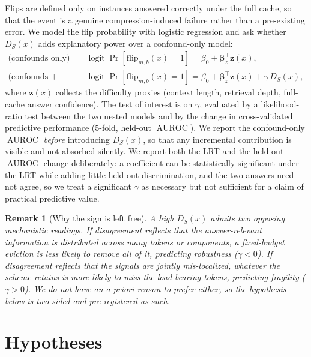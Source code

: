 \documentclass[11pt]{article}
\newtheorem{remark}{Remark}
\DeclareMathOperator{\AUROC}{AUROC}
\begin{document}
Flips are defined only on instances answered correctly under the full cache,
so that the event is a genuine compression-induced failure rather than a
pre-existing error. We model the flip probability with logistic regression
and ask whether $D_S(x)$ adds explanatory power over a confound-only model:
\begin{align}
  \text{(confounds only)} \quad
  &\operatorname{logit} \Pr[\mathrm{flip}_{m,b}(x)=1]
   = \beta_0 + \boldsymbol{\beta}_z^\top \mathbf{z}(x), \\[4pt]
  \text{(confounds + disagreement)} \quad
  &\operatorname{logit} \Pr[\mathrm{flip}_{m,b}(x)=1]
   = \beta_0 + \boldsymbol{\beta}_z^\top \mathbf{z}(x) + \gamma\,D_S(x),
\end{align}
where $\mathbf{z}(x)$ collects the difficulty proxies (context length,
retrieval depth, full-cache answer confidence). The test of interest is on
$\gamma$, evaluated by a likelihood-ratio test between the two nested models
and by the change in cross-validated predictive performance ($5$-fold,
held-out $\AUROC$). We report the confound-only $\AUROC$ \emph{before}
introducing $D_S(x)$, so that any incremental contribution is visible and
not absorbed silently. We report both the LRT and the held-out $\AUROC$
change deliberately: a coefficient can be statistically significant under the
LRT while adding little held-out discrimination, and the two answers need not
agree, so we treat a significant $\gamma$ as necessary but not sufficient for
a claim of practical predictive value.

\begin{remark}[Why the sign is left free]
A high $D_S(x)$ admits two opposing mechanistic readings. If disagreement
reflects that the answer-relevant information is \emph{distributed} across
many tokens or components, a fixed-budget eviction is \emph{less} likely to
remove all of it, predicting robustness ($\gamma < 0$). If disagreement
reflects that the signals are jointly \emph{mis-localized}, whatever the
scheme retains is more likely to miss the load-bearing tokens, predicting
fragility ($\gamma > 0$). We do not have an a priori reason to prefer either,
so the hypothesis below is two-sided and pre-registered as such.
\end{remark}

\section{Hypotheses}
\label{sec:hypotheses}
\end{document}
